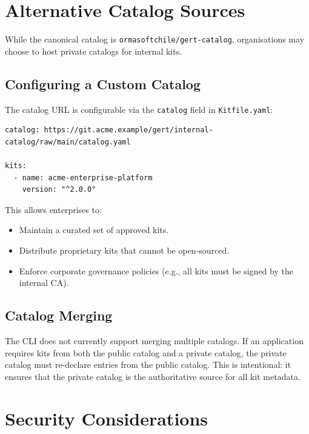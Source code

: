\section{Alternative Catalog Sources}
\label{sec:alternative-catalogs}

While the canonical catalog is \texttt{ormasoftchile/gert-catalog}, organisations may choose to host private catalogs for internal kits.

\subsection{Configuring a Custom Catalog}

The catalog URL is configurable via the \texttt{catalog} field in \texttt{Kitfile.yaml}:

\begin{verbatim}
catalog: https://git.acme.example/gert/internal-catalog/raw/main/catalog.yaml

kits:
  - name: acme-enterprise-platform
    version: "^2.0.0"
\end{verbatim}

This allows enterprises to:

\begin{itemize}
  \item Maintain a curated set of approved kits.
  \item Distribute proprietary kits that cannot be open-sourced.
  \item Enforce corporate governance policies (e.g., all kits must be signed by the internal CA).
\end{itemize}

\subsection{Catalog Merging}

The CLI does not currently support merging multiple catalogs. If an application requires kits from both the public catalog and a private catalog, the private catalog must re-declare entries from the public catalog. This is intentional: it ensures that the private catalog is the authoritative source for all kit metadata.

\section{Security Considerations}
\label{sec:catalog-security}

